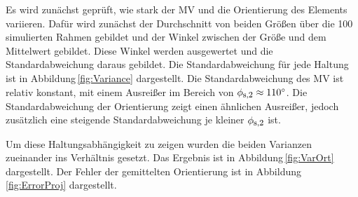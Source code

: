 Es wird zunächst geprüft, wie stark der MV und die Orientierung des Elements variieren. Dafür wird zunächst der Durchschnitt von beiden Größen über die 100 simulierten Rahmen gebildet und der Winkel zwischen der Größe und dem Mittelwert gebildet. Diese Winkel werden ausgewertet und die Standardabweichung daraus gebildet. Die Standardabweichung für jede Haltung ist in Abbildung\,\ref{fig:Variance} dargestellt. 
Die Standardabweichung des MV ist relativ konstant, mit einem Ausreißer im Bereich von $\phi_{\textrm{\footnotesize{s,2}}}\approx 110^\circ$. Die Standardabweichung der Orientierung zeigt einen ähnlichen Ausreißer, jedoch zusätzlich eine steigende Standardabweichung je kleiner $\phi_{\textrm{\footnotesize{s,2}}}$ ist.

Um diese Haltungsabhängigkeit zu zeigen wurden die beiden Varianzen zueinander ins Verhältnis gesetzt. Das Ergebnis ist in Abbildung\,\ref{fig:VarOrt} dargestellt. Der Fehler der gemittelten Orientierung ist in Abbildung\,\ref{fig:ErrorProj} dargestellt.


